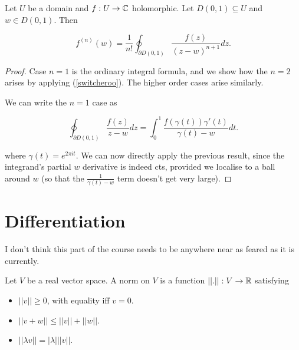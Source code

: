 \documentclass[11pt]{scrartcl}
\begin{document}
\begin{theorem}

Let $U$ be a domain and $f : U \to \mathbb C$ holomorphic. Let $D(0, 1) \subseteq U$ and $w \in D(0, 1)$. Then

\begin{equation}
    f^{(n)}(w) = \frac{1}{n!} \oint_{\partial D(0, 1)} \frac{f(z)}{(z-w)^{n+1}} dz.
\end{equation}

\begin{proof}
    Case $n=1$ is the ordinary integral formula, and we show how the $n=2$ arises by applying (\ref{switcheroo}). The higher order cases arise similarly.

    We can write the $n=1$ case as

    \begin{equation}
        \oint_{\partial D(0, 1)} \frac{f(z)}{z-w} dz = \int_0^1 \frac{f(\gamma(t))\gamma'(t)}{\gamma(t)-w} dt.
    \end{equation}

    where $\gamma(t) = e^{2 \pi i t}$. We can now directly apply the previous result, since the integrand's partial $w$ derivative is indeed cts, provided we localise to a ball around $w$ (so that the $\frac{1}{\gamma(t)-w}$ term doesn't get very large).
\end{proof}
\end{theorem}


\section{Differentiation}

I don't think this part of the course needs to be anywhere near as feared as it is currently.

\begin{definition}
[Norm]

Let $V$ be a real vector space. A norm on $V$ is a function $||.|| : V \rightarrow \mathbb R$ satisfying

\begin{itemize}
\item $||v|| \ge 0$, with equality iff $v=0$.
\item $||v+w|| \le ||v|| + ||w||$.
\item $||\lambda v|| = |\lambda| ||v||$.
\end{itemize}
\end{definition}
\end{document}
